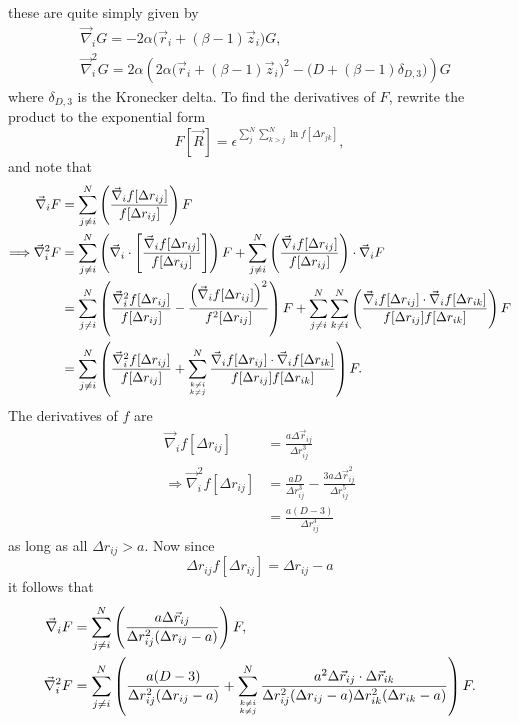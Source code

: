 \documentclass[a4paper,8pt]{article}
\begin{document}
these are quite simply given by
\begin{align}
&\vec{\nabla}_i G = -2\alpha\Big(\vec{r}_i+(\beta-1)\vec{z}_i\Big)G, \label{grad_G}\\
&\vec{\nabla}_i^2G = 2\alpha\left(2\alpha\Big(\vec{r}_i+(\beta-1)\vec{z}_i\Big)^2-\Big(D+(\beta-1)\delta_{D,3}\Big)\right)G \label{Lap_G}
\end{align}
where $\delta_{D,3}$ is the Kronecker delta. To find the derivatives of $F$, rewrite the product to the exponential form 
\begin{equation}
F[\vec{R}] = \epsilon^{\sum\limits_{j}^N\sum\limits_{k > j}^N \ln f[\Delta{r}_{jk}]},
\end{equation}
and note that
\begin{align}
\vec{\nabla}_i F &= \sum\limits_{j \neq i}^N \left(\frac{\vec{\nabla}_i f[\Delta{r}_{ij}]}{f[\Delta{r}_{ij}]}\right) F \\
\Longrightarrow \vec{\nabla}_i^2 F &= \sum\limits_{j \neq i}^N \left(\vec{\nabla}_i\cdot\left[\frac{\vec{\nabla}_i f[\Delta{r}_{ij}]}{f[\Delta{r}_{ij}]}\right]\right) F + \sum\limits_{j \neq i}^N \left(\frac{\vec{\nabla}_i f[\Delta{r}_{ij}]}{f[\Delta{r}_{ij}]}\right)\cdot \vec{\nabla}_i F \nonumber\\
&= \sum\limits_{j \neq i}^N \left(\frac{\vec{\nabla}_i^2 f[\Delta{r}_{ij}]}{f[\Delta{r}_{ij}]} - \frac{\left(\vec{\nabla}_i f[\Delta{r}_{ij}]\right)^2}{f^2[\Delta{r}_{ij}]}\right) F + \sum\limits_{j \neq i}^N \sum\limits_{k \neq i}^N \left(\frac{\vec{\nabla}_i f[\Delta{r}_{ij}] \cdot\vec{\nabla}_i f[\Delta{r}_{ik}]}{f[\Delta{r}_{ij}]f[\Delta{r}_{ik}]}\right) F \nonumber\\
&= \sum\limits_{j \neq i}^N \left(\frac{\vec{\nabla}_i^2 f[\Delta{r}_{ij}]}{f[\Delta{r}_{ij}]} + \sum\limits_{{k \neq i}\atop{k \neq j}}^N \frac{\vec{\nabla}_i f[\Delta{r}_{ij}] \cdot\vec{\nabla}_i f[\Delta{r}_{ik}]}{f[\Delta{r}_{ij}]f[\Delta{r}_{ik}]}\right) F.
\end{align}
The derivatives of $f$ are
\begin{align}
\vec{\nabla}_i f[\Delta{r}_{ij}] &= \frac{a\Delta\vec{r}_{ij}}{\Delta{r}_{ij}^3} \\
\Longrightarrow \vec{\nabla}_i^2 f[\Delta{r}_{ij}] &= \frac{aD}{\Delta{r}_{ij}^3}-\frac{3a\Delta\vec{r}_{ij}^2}{\Delta{r}_{ij}^5} \nonumber\\
&= \frac{a(D-3)}{\Delta{r}_{ij}^3}
\end{align}
as long as all $\Delta{r}_{ij} > a$. Now since
\begin{equation}
\Delta{r}_{ij} f[\Delta{r}_{ij}] = \Delta{r}_{ij}-a
\end{equation}
it follows that
\begin{align}
\vec{\nabla}_i F &= \sum\limits_{j \neq i}^N \left(\frac{a\Delta\vec{r}_{ij}}{\Delta{r}_{ij}^2(\Delta{r}_{ij}-a)}\right) F, \label{grad_F}\\
\vec{\nabla}_i^2 F &= \sum\limits_{j \neq i}^N \left(\frac{a(D-3)}{\Delta{r}_{ij}^2(\Delta{r}_{ij}-a)} + \sum\limits_{{k \neq i}\atop{k \neq j}}^N \frac{a^2 \Delta\vec{r}_{ij} \cdot \Delta\vec{r}_{ik}}{\Delta{r}_{ij}^2(\Delta{r}_{ij}-a) \Delta{r}_{ik}^2(\Delta{r}_{ik}-a)}\right) F. \label{Lap_F}
\end{align}
\end{document}
